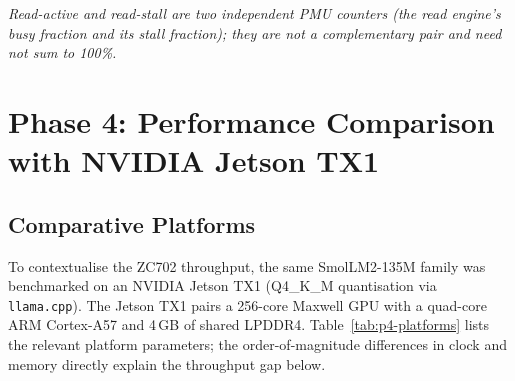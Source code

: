 \begin{table}[H]
\centering
\caption{Per-configuration throughput and memory traffic measured on the ZC702 (30-prompt workload).}
\label{tab:p3-perf}
\renewcommand{\arraystretch}{1.2}

\par\vspace{2pt}
{\footnotesize\itshape Read-active and read-stall are two independent PMU counters (the read engine's
busy fraction and its stall fraction); they are not a complementary pair and need not sum to 100\%.}
\end{table}

\section{Phase 4: Performance Comparison with NVIDIA Jetson TX1}

\subsection{Comparative Platforms}

To contextualise the ZC702 throughput, the same SmolLM2-135M family was benchmarked on an NVIDIA
Jetson TX1 (Q4\_K\_M quantisation via \texttt{llama.cpp}). The Jetson TX1 pairs a 256-core Maxwell
GPU with a quad-core ARM Cortex-A57 and 4\,GB of shared LPDDR4. Table~\ref{tab:p4-platforms} lists
the relevant platform parameters; the order-of-magnitude differences in clock and memory directly
explain the throughput gap below.


